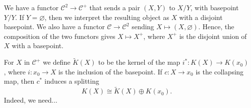 \documentclass[12pt,a4paper]{amsart}
\theoremstyle{plain}
\theoremstyle{definition}
\theoremstyle{remark}
\begin{document}
We have a functor $\mathcal{C}^{2} \to \mathcal{C}^{+}$ that sends a pair $(X,Y)$ to $X/Y$, with basepoint $Y/Y$.
If $Y = \varnothing$, then we interpret the resulting object as $X$ with a disjoint basepoint.
We also have a functor $\mathcal{C} \to \mathcal{C}^{2}$ sending $X \mapsto (X, \varnothing)$.
Hence, the composition of the two functors gives $X \mapsto X^{+}$, where $X^{+}$ is the disjoint union of $X$ with a basepoint.

For $X$ in $\mathcal{C}^{+}$ we define $\tilde{K}(X)$ to be the kernel of the map $i^{*} \colon K(X) \to K(x_{0})$, where $i \colon x_{0} \to X$ is the inclusion of the basepoint.
If $c \colon X \to x_{0}$ is the collapsing map, then $c^{*}$ induces a splitting
\[ K(X) \cong \tilde{K}(X) \oplus K(x_{0}). \]
Indeed, we need...



\vfill
\end{document}
